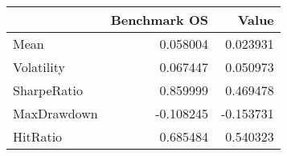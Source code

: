 \begin{tabular}{lrr}
\toprule
{} &  Benchmark OS &     Value \\
\midrule
Mean        &      0.058004 &  0.023931 \\
Volatility  &      0.067447 &  0.050973 \\
SharpeRatio &      0.859999 &  0.469478 \\
MaxDrawdown &     -0.108245 & -0.153731 \\
HitRatio    &      0.685484 &  0.540323 \\
\bottomrule
\end{tabular}
